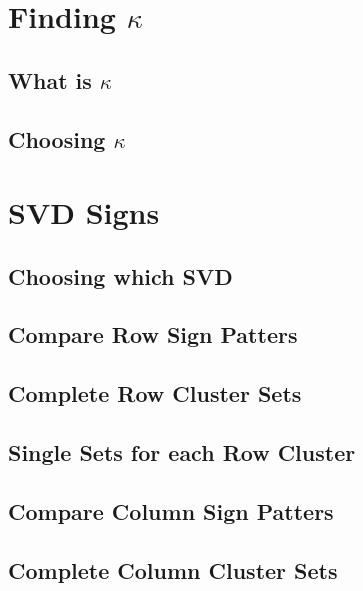 \documentclass[ClusteringConnectionsMAIN.tex]{subfiles}
\begin{document}
%
%
\chapter{Finding $\kappa$}


\section{What is $\kappa$}


\section{Choosing $\kappa$}



%
%
\chapter{SVD Signs}


\section{Choosing which SVD}


\section{Compare Row Sign Patters}


\section{Complete Row Cluster Sets}


\section{Single Sets for each Row Cluster}


\section{Compare Column Sign Patters}


\section{Complete Column Cluster Sets}

\end{document}
